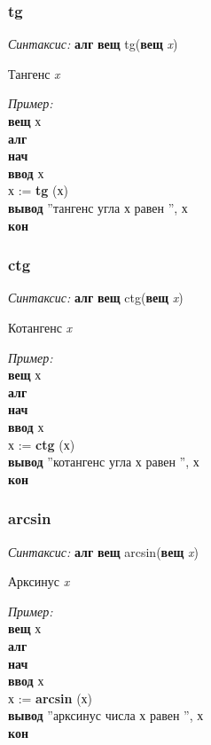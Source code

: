 \normalfont
\subsubsection{tg}

\emph{Синтаксис:} \textbf{алг} \textbf{вещ} tg(\textbf{вещ} \emph{x})


     
 
		Тангенс \emph{x}
      
\emph{Пример:} 
\sffamily
~\\\textbf{вещ} х
~\\\textbf{алг 
~\\нач
~\\\otstup ввод} х
~\\\otstup х := \textbf{tg} (х)
~\\\otstup \textbf{вывод} ''тангенс угла х равен '', х
~\\\textbf{кон}


 
\normalfont
\subsubsection{ctg}

\emph{Синтаксис:} \textbf{алг} \textbf{вещ} ctg(\textbf{вещ} \emph{x})


    
  
		Котангенс \emph{x}
      
\emph{Пример:} 
\sffamily
~\\\textbf{вещ} х
~\\\textbf{алг 
~\\нач
~\\\otstup ввод} х
~\\\otstup х := \textbf{ctg} (х)
~\\\otstup \textbf{вывод} ''котангенс угла х равен '', х
~\\\textbf{кон}

\normalfont
\subsubsection{arcsin}

\emph{Синтаксис:} \textbf{алг} \textbf{вещ} arcsin(\textbf{вещ} \emph{x})


      
		
Арксинус \emph{x}
      
\emph{Пример:}  
\sffamily
~\\\textbf{вещ} х
~\\\textbf{алг 
~\\нач
~\\\otstup ввод} х
~\\\otstup х := \textbf{arcsin} (х)
~\\\otstup \textbf{вывод} ''арксинус числа х равен '', х
~\\\textbf{кон}

